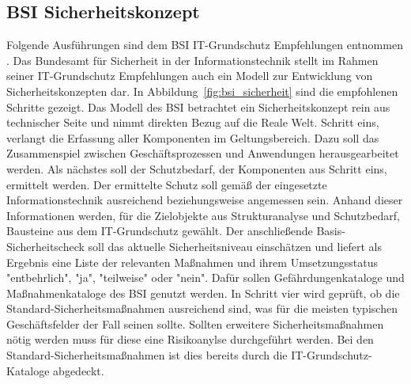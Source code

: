 \documentclass[11pt,a4paper]{report}
\begin{document}
\subsection{BSI Sicherheitskonzept}
Folgende Ausführungen sind dem BSI IT-Grundschutz Empfehlungen entnommen \cite{bsi_standard1,bsi_standard2,bsi_standard3,bsi_standard4}.
Das Bundesamt für Sicherheit in der Informationstechnik stellt im Rahmen seiner IT-Grundschutz Empfehlungen auch ein Modell zur Entwicklung von Sicherheitskonzepten dar. In Abbildung~\ref{fig:bsi_sicherheit} sind die empfohlenen Schritte gezeigt. Das Modell des BSI betrachtet ein Sicherheitskonzept rein aus technischer Seite und nimmt direkten Bezug auf die Reale Welt. Schritt eins, verlangt die Erfassung aller Komponenten im Geltungsbereich. Dazu soll das Zusammenspiel zwischen Geschäftsprozessen und Anwendungen herausgearbeitet werden. Als nächstes soll der Schutzbedarf, der Komponenten aus Schritt eins, ermittelt werden. Der ermittelte Schutz soll gemäß der eingesetzte Informationstechnik ausreichend beziehungsweise angemessen sein. Anhand dieser Informationen werden, für die Zielobjekte aus Strukturanalyse und Schutzbedarf, Bausteine aus dem IT-Grundschutz gewählt. Der anschließende Basis-Sicherheitscheck soll das aktuelle Sicherheitsniveau einschätzen und liefert als Ergebnis eine Liste der relevanten Maßnahmen und ihrem Umsetzungsstatus "entbehrlich", "ja", "teilweise" oder "nein". Dafür sollen Gefährdungenkataloge und Maßnahmenkataloge des BSI genutzt werden. In Schritt vier wird geprüft, ob die Standard-Sicherheitsmaßnahmen ausreichend sind, was für die meisten typischen Geschäftsfelder der Fall seinen sollte. Sollten erweitere Sicherheitsmaßnahmen nötig werden muss für diese eine Risikoanylse durchgeführt werden. Bei den Standard-Sicherheitsmaßnahmen ist dies bereits durch die IT-Grundschutz-Kataloge abgedeckt. 
\end{document}
